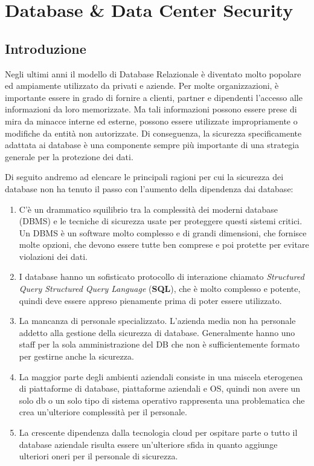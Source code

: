 \chapter{Database \& Data Center Security}
\section{Introduzione} %

Negli ultimi anni il modello di Database Relazionale è diventato molto popolare ed ampiamente utilizzato da
privati e aziende.
Per molte organizzazioni, è importante essere in grado di
fornire a clienti, partner e dipendenti l'accesso alle informazioni da loro memorizzate. Ma tali
informazioni possono essere prese di mira da minacce interne ed esterne, possono essere utilizzate
impropriamente o modifiche da entità non autorizzate. Di conseguenza, la sicurezza
specificamente adattata ai database è una componente sempre più importante di una strategia generale per la protezione dei dati.

Di seguito andremo ad elencare le principali ragioni per cui la sicurezza dei database non ha tenuto il passo con
l'aumento della dipendenza dai database:

\begin{enumerate}
    \item C'è un drammatico squilibrio tra la complessità dei moderni
          database (DBMS) e le tecniche di sicurezza usate per proteggere questi
          sistemi critici. Un DBMS è un software molto complesso e di grandi
          dimensioni, che fornisce molte opzioni, che devono essere tutte ben
          comprese e poi protette per evitare violazioni dei dati.
    \item I database hanno un sofisticato protocollo di interazione chiamato
          \textit{Structured Query Structured Query Language} (\textbf{SQL}),
          che è molto complesso e potente, quindi deve essere appreso pienamente
          prima di poter essere utilizzato.
    \item La mancanza di personale specializzato. L'azienda media non ha
          personale addetto alla gestione della sicurezza di database.
          Generalmente hanno uno staff per la sola amministrazione del DB che
          non è sufficientemente formato per gestirne anche la sicurezza.
    \item La maggior parte degli ambienti aziendali consiste in una miscela
          eterogenea di piattaforme di database, piattaforme aziendali e OS,
          quindi non avere un solo db o un solo tipo di sistema operativo
          rappresenta una problematica che crea un'ulteriore complessità per il
          personale.
    \item La crescente dipendenza dalla tecnologia cloud per ospitare parte o
          tutto il database aziendale risulta essere un'ulteriore sfida in quanto
          aggiunge ulteriori oneri per il
          personale di sicurezza.
\end{enumerate}

